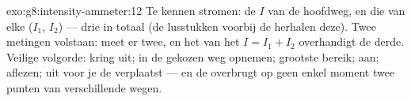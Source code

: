 \begin{solution}{exo:g8:intensity-ammeter:12}
Te kennen stromen: de $I$ van de hoofdweg, en die van elke
 ($I_1$, $I_2$) --- drie in totaal (de lusstukken voorbij de
 herhalen deze). Twee metingen volstaan:
meet er twee, en het  van het 
$I = I_1 + I_2$ overhandigt de derde. Veilige volgorde: kring uit;
 in de gekozen weg opnemen; grootste bereik; aan; aflezen; uit
voor je de  verplaatst --- en de  overbrugt op geen enkel
moment twee punten van verschillende wegen.
\end{solution}

